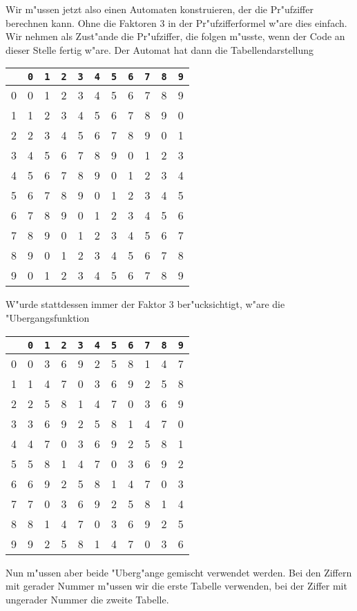 {\begin{loesung}
Wir m"ussen jetzt also einen Automaten konstruieren, der die
Pr"ufziffer berechnen kann.
Ohne die Faktoren $3$ in der Pr"ufzifferformel
w"are dies einfach. Wir nehmen als Zust"ande die Pr"ufziffer,
die folgen m"usste, wenn der Code an dieser Stelle fertig w"are.
Der Automat hat dann die Tabellendarstellung
\begin{center}
\begin{tabular}{|c|cccccccccc|}
\hline
&{\tt 0} &{\tt 1} &{\tt 2} &{\tt 3} &{\tt 4} &{\tt 5} &{\tt 6} &{\tt 7} &{\tt 8} &{\tt 9}\\
\hline
0&0&1&2&3&4&5&6&7&8&9\\
1&1&2&3&4&5&6&7&8&9&0\\
2&2&3&4&5&6&7&8&9&0&1\\
3&4&5&6&7&8&9&0&1&2&3\\
4&5&6&7&8&9&0&1&2&3&4\\
5&6&7&8&9&0&1&2&3&4&5\\
6&7&8&9&0&1&2&3&4&5&6\\
7&8&9&0&1&2&3&4&5&6&7\\
8&9&0&1&2&3&4&5&6&7&8\\
9&0&1&2&3&4&5&6&7&8&9\\
\hline
\end{tabular}
\end{center}
W"urde stattdessen immer der Faktor $3$ ber"ucksichtigt, w"are
die "Ubergangsfunktion
\begin{center}
\begin{tabular}{|c|cccccccccc|}
\hline
&{\tt 0} &{\tt 1} &{\tt 2} &{\tt 3} &{\tt 4} &{\tt 5} &{\tt 6} &{\tt 7} &{\tt 8} &{\tt 9}\\
\hline
0&0&3&6&9&2&5&8&1&4&7\\
1&1&4&7&0&3&6&9&2&5&8\\
2&2&5&8&1&4&7&0&3&6&9\\
3&3&6&9&2&5&8&1&4&7&0\\
4&4&7&0&3&6&9&2&5&8&1\\
5&5&8&1&4&7&0&3&6&9&2\\
6&6&9&2&5&8&1&4&7&0&3\\
7&7&0&3&6&9&2&5&8&1&4\\
8&8&1&4&7&0&3&6&9&2&5\\
9&9&2&5&8&1&4&7&0&3&6\\
\hline
\end{tabular}
\end{center}
Nun m"ussen aber beide "Uberg"ange gemischt verwendet werden.
Bei den Ziffern mit gerader Nummer m"ussen wir die erste Tabelle
verwenden, bei der Ziffer mit ungerader Nummer die zweite Tabelle.

\end{loesung}}

